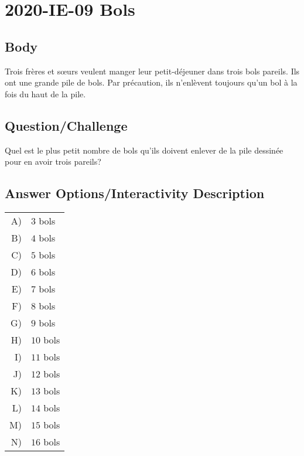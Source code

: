 \documentclass[a4paper,11pt]{report}
\newcommand{\taskGraphicsFolder}{..}
\begin{document}
\section*{\centering{} 2020-IE-09 Bols}


\subsection*{Body}

Trois frères et sœurs veulent manger leur petit-déjeuner dans trois bols pareils. Ils ont une grande pile de bols. Par précaution, ils n’enlèvent toujours qu’un bol à la fois du haut de la pile.

{\centering%
\par}

{\em

\subsection*{Question/Challenge}

Quel est le plus petit nombre de bols qu’ils doivent enlever de la pile dessinée pour en avoir trois pareils?

}\begingroup
\renewcommand{\arraystretch}{1.5}
\subsection*{Answer Options/Interactivity Description}

\begin{tabular}{ @{} r l @{} }
  A) & $3$ bols \\ 
  B) & $4$ bols \\ 
  C) & $5$ bols \\ 
  D) & $6$ bols \\ 
  E) & $7$ bols \\ 
  F) & $8$ bols \\ 
  G) & $9$ bols \\ 
  H) & $10$ bols \\ 
  I) & $11$ bols \\ 
  J) & $12$ bols \\ 
  K) & $13$ bols \\ 
  L) & $14$ bols \\ 
  M) & $15$ bols \\ 
  N) & $16$ bols
\end{tabular}

\endgroup
\end{document}
